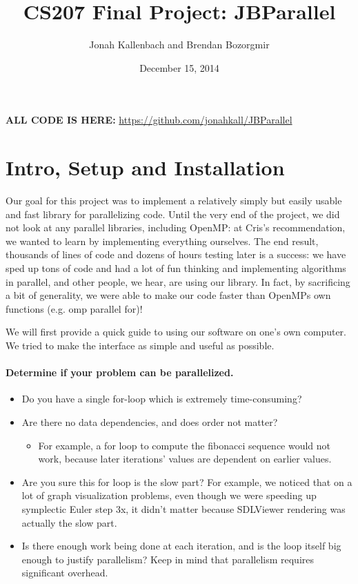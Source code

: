 \documentclass{article}
\title{CS207 Final Project: JBParallel}
\author{Jonah Kallenbach and Brendan Bozorgmir}
\date{December 15, 2014}
\begin{document}
\maketitle

\textbf{ALL CODE IS HERE:} \url{https://github.com/jonahkall/JBParallel}

\section{Intro, Setup and Installation}

Our goal for this project was to implement a relatively simply but easily usable and fast library for parallelizing code.  Until the very end of the project, we did not look at any parallel libraries, including OpenMP: at Cris's recommendation, we wanted to learn by implementing everything ourselves.  The end result, thousands of lines of code and dozens of hours testing later is a success: we have sped up tons of code and had a lot of fun thinking and implementing algorithms in parallel, and other people, we hear, are using our library.  In fact, by sacrificing a bit of generality, we were able to make our code faster than OpenMPs own functions (e.g. omp parallel for)!

We will first provide a quick guide to using our software on one's own computer.  We tried to make the interface as simple and useful as possible.
 
\paragraph*{Determine if your problem can be parallelized.}
\begin{itemize}
\item{Do you have a single for-loop which is extremely time-consuming?}
\item Are there no data dependencies, and does order not matter?
\begin{itemize}
	\item For example, a for loop to compute the fibonacci sequence would not work, because later iterations' values are dependent on earlier values.
\end{itemize}

\item Are you sure this for loop is the slow part? For example, we noticed that on a lot of graph visualization problems, even though we were speeding up symplectic Euler step 3x, it didn't matter because SDLViewer rendering was actually the slow part.
\item Is there enough work being done at each iteration, and is the loop itself big enough to justify parallelism? Keep in mind that parallelism requires significant overhead.
\end{itemize}
\end{document}
